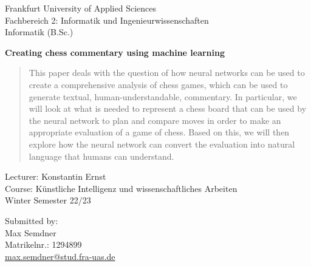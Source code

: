 \begin{titlepage}
\begin{flushleft}
Frankfurt University of Applied Sciences\\
Fachbereich 2: Informatik und Ingenieurwissenschaften\\
Informatik (B.Sc.)\\
\end{flushleft}

\vspace{3.5cm}

\begin{center}
\Large
\textbf{Creating chess commentary using machine learning}\\
\end{center}

\begin{abstract}
This paper deals with the question of how neural networks can be used to create a comprehensive analysis of chess games, which can be used to generate textual, human-understandable, commentary. In particular, we will look at what is needed to represent a chess board that can be used by the neural network to plan and compare moves in order to make an appropriate evaluation of a game of chess. Based on this, we will then explore how the neural network can convert the evaluation into natural language that humans can understand.
\end{abstract}

\vspace{6cm}
	
\begin{flushright}
Lecturer: Konstantin Ernst\\
Course: Künstliche Intelligenz und wissenschaftliches Arbeiten\\
Winter Semester 22/23\\
\end{flushright}

\vspace{2cm}

\begin{flushleft}
Submitted by:\\
Max Semdner\\
Matrikelnr.: 1294899\\
\href{mailto: max.semdner@stud.fra-uas.de}{max.semdner@stud.fra-uas.de}\\
\end{flushleft}

\end{titlepage}